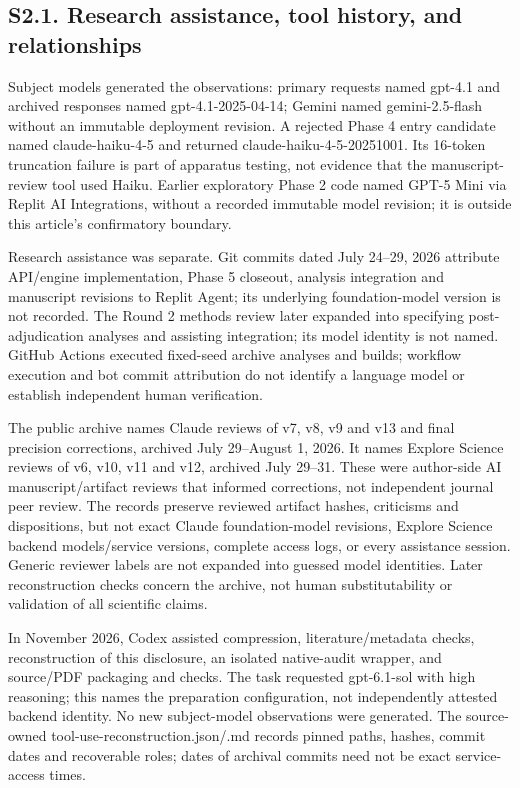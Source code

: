 \documentclass[11pt]{article}
\begin{document}
\subsection{S2.1. Research assistance, tool history, and
relationships}\label{s2.1.-research-assistance-tool-history-and-relationships}

Subject models generated the observations: primary requests named
gpt-4.1 and archived responses named gpt-4.1-2025-04-14; Gemini named
gemini-2.5-flash without an immutable deployment revision. A rejected
Phase 4 entry candidate named claude-haiku-4-5 and returned
claude-haiku-4-5-20251001. Its 16-token truncation failure is part of
apparatus testing, not evidence that the manuscript-review tool used
Haiku. Earlier exploratory Phase 2 code named GPT-5 Mini via Replit AI
Integrations, without a recorded immutable model revision; it is outside
this article's confirmatory boundary.

Research assistance was separate. Git commits dated July 24--29, 2026
attribute API/engine implementation, Phase 5 closeout, analysis
integration and manuscript revisions to Replit Agent; its underlying
foundation-model version is not recorded. The Round 2 methods review
later expanded into specifying post-adjudication analyses and assisting
integration; its model identity is not named. GitHub Actions executed
fixed-seed archive analyses and builds; workflow execution and bot
commit attribution do not identify a language model or establish
independent human verification.

The public archive names Claude reviews of v7, v8, v9 and v13 and final
precision corrections, archived July 29--August 1, 2026. It names
Explore Science reviews of v6, v10, v11 and v12, archived July 29--31.
These were author-side AI manuscript/artifact reviews that informed
corrections, not independent journal peer review. The records preserve
reviewed artifact hashes, criticisms and dispositions, but not exact
Claude foundation-model revisions, Explore Science backend
models/service versions, complete access logs, or every assistance
session. Generic reviewer labels are not expanded into guessed model
identities. Later reconstruction checks concern the archive, not human
substitutability or validation of all scientific claims.

In November 2026, Codex assisted compression, literature/metadata
checks, reconstruction of this disclosure, an isolated native-audit
wrapper, and source/PDF packaging and checks. The task requested
gpt-6.1-sol with high reasoning; this names the preparation
configuration, not independently attested backend identity. No new
subject-model observations were generated. The source-owned
tool-use-reconstruction.json/.md records pinned paths, hashes, commit
dates and recoverable roles; dates of archival commits need not be exact
service-access times.
\end{document}
